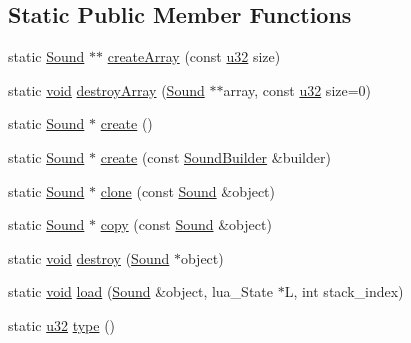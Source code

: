 \subsection*{Static Public Member Functions}
\begin{DoxyCompactItemize}
\item 
static \mbox{\hyperlink{classnjli_1_1_sound}{Sound}} $\ast$$\ast$ \mbox{\hyperlink{classnjli_1_1_sound_afe9d314ce74f806284a71dc06b4ed49a}{create\+Array}} (const \mbox{\hyperlink{_util_8h_a10e94b422ef0c20dcdec20d31a1f5049}{u32}} size)
\item 
static \mbox{\hyperlink{_thread_8h_af1e856da2e658414cb2456cb6f7ebc66}{void}} \mbox{\hyperlink{classnjli_1_1_sound_af1810cb796cda9c9d84ba28f3a0d8ddf}{destroy\+Array}} (\mbox{\hyperlink{classnjli_1_1_sound}{Sound}} $\ast$$\ast$array, const \mbox{\hyperlink{_util_8h_a10e94b422ef0c20dcdec20d31a1f5049}{u32}} size=0)
\item 
static \mbox{\hyperlink{classnjli_1_1_sound}{Sound}} $\ast$ \mbox{\hyperlink{classnjli_1_1_sound_a1e4eecd523bbdeb14ad7960be052ece9}{create}} ()
\item 
static \mbox{\hyperlink{classnjli_1_1_sound}{Sound}} $\ast$ \mbox{\hyperlink{classnjli_1_1_sound_a0541df0bea26b9f9f17d73b996d23aa6}{create}} (const \mbox{\hyperlink{classnjli_1_1_sound_builder}{Sound\+Builder}} \&builder)
\item 
static \mbox{\hyperlink{classnjli_1_1_sound}{Sound}} $\ast$ \mbox{\hyperlink{classnjli_1_1_sound_a59f89544f5a6b184f8b19a53a7477000}{clone}} (const \mbox{\hyperlink{classnjli_1_1_sound}{Sound}} \&object)
\item 
static \mbox{\hyperlink{classnjli_1_1_sound}{Sound}} $\ast$ \mbox{\hyperlink{classnjli_1_1_sound_a9ec3756dbe60a666478daf5e2d0a17d8}{copy}} (const \mbox{\hyperlink{classnjli_1_1_sound}{Sound}} \&object)
\item 
static \mbox{\hyperlink{_thread_8h_af1e856da2e658414cb2456cb6f7ebc66}{void}} \mbox{\hyperlink{classnjli_1_1_sound_a023bb75371ded2019f650dfa8b6e03f6}{destroy}} (\mbox{\hyperlink{classnjli_1_1_sound}{Sound}} $\ast$object)
\item 
static \mbox{\hyperlink{_thread_8h_af1e856da2e658414cb2456cb6f7ebc66}{void}} \mbox{\hyperlink{classnjli_1_1_sound_a41494cb822b91e70ec894f8eb2bfdd54}{load}} (\mbox{\hyperlink{classnjli_1_1_sound}{Sound}} \&object, lua\+\_\+\+State $\ast$L, int stack\+\_\+index)
\item 
static \mbox{\hyperlink{_util_8h_a10e94b422ef0c20dcdec20d31a1f5049}{u32}} \mbox{\hyperlink{classnjli_1_1_sound_a77826080c397a43ac8c78967aeea33f6}{type}} ()
\end{DoxyCompactItemize}
